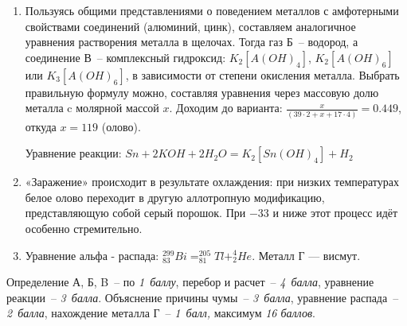 \solutionSection

\begin{enumerate}
\item Пользуясь общими представлениями о поведением металлов с амфотерными свойствами соединений (алюминий, цинк), составляем аналогичное уравнения растворения металла в щелочах. Тогда газ Б~-- водород, а соединение В~-- комплексный гидроксид: $K_2[A(OH)_4]$, $K_2[A(OH)_6]$ или $K_3[A(OH)_6]$, в зависимости от степени окисления металла. Выбрать правильную формулу можно, составляя уравнения через массовую долю металла c молярной массой $x$. Доходим до варианта: $\frac{x}{(39\cdot2+x+17\cdot4)}=0.449$, откуда $x = 119$ (олово).

Уравнение реакции: $Sn+2KOH+2H_2O=K_2[Sn(OH)_4]+H_2$
\item «Заражение» происходит в результате охлаждения: при низких температурах белое олово переходит в другую аллотропную модификацию, представляющую собой серый порошок. При $-33$ и ниже этот процесс идёт особенно стремительно. 
\item Уравнение альфа - распада: $_{83}^{299}Bi=_{81}^{205}Tl+_2^4He$. Металл Г — висмут.
\end{enumerate}

\additionalCriteria

Определение А, Б, B~-- по \textit{1~баллу}, перебор и расчет~-- \textit{4~балла}, уравнение реакции~-- \textit{3~балла}. Объяснение причины чумы~-- \textit{3~балла}, уравнение распада~-- \textit{2~балла}, нахождение металла Г~-- \textit{1~балл,} максимум \textit{16 баллов}.